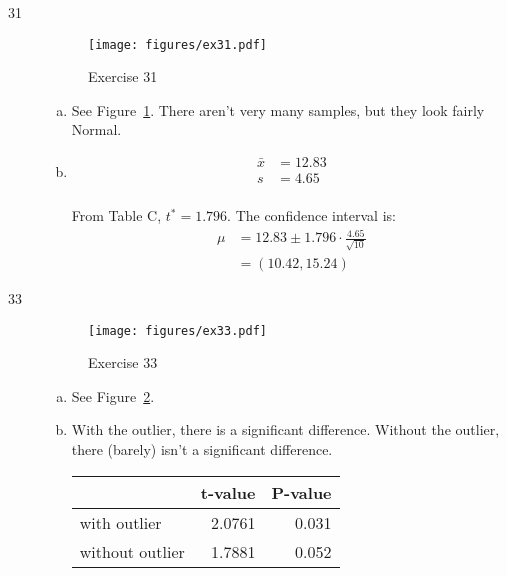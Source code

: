 \documentclass[letterpaper, landscape]{exam}
\begin{document}
\begin{description}
      \item[31]
        \begin{figure}[H]
          \centering
          \texttt{[image: figures/ex31.pdf]}
          \caption{Exercise 31}\label{fig:ex31}
        \end{figure}
        
        \begin{enumerate}[(a)]
          \item See Figure~\ref{fig:ex31}. There aren't very many samples, but
            they look fairly Normal.

          \item
            \begin{align*}
              \bar{x} & = 12.83 \\
              s       & = 4.65 \\
            \end{align*}

            From Table C, $t^* = 1.796$. The confidence interval is:
            \begin{align*}
              \mu & = 12.83 \pm 1.796 \cdot \frac{4.65}{\sqrt{10}} \\
                  & = (10.42, 15.24)
            \end{align*}
        \end{enumerate}

      \item[33]
        \begin{figure}[H]
          \centering
          \texttt{[image: figures/ex33.pdf]}
          \caption{Exercise 33}\label{fig:ex33}
        \end{figure}

        \begin{enumerate}[(a)]
          \item See Figure~\ref{fig:ex33}.

          \item 
            With the outlier, there is a significant difference. Without the
            outlier, there (barely) isn't a significant difference.

            \begin{tabular}[H]{lrr}
              \toprule
                              & t-value & P-value \\
              \midrule
              with outlier    & 2.0761  & 0.031 \\
              without outlier & 1.7881  & 0.052 \\
              \bottomrule
            \end{tabular}


\end{enumerate}
\end{description}
\end{document}
